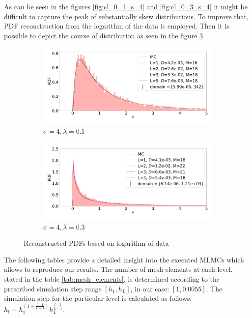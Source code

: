 \documentclass{article}
\begin{document}
As can be seen in the figures \ref{fig:cl_0_1_s_4} and \ref{fig:cl_0_3_s_4} it might be difficult to capture the peak of substantially skew distributions. To improve that, PDF reconstruction from the logarithm of the data is employed. Then it is possible to depict the course of distribution as seen in the figure \ref{fig:log_flow_distrs}.

\begin{figure}[!htp]
    \centering 
\begin{subfigure}{0.5\textwidth}
  \includegraphics[width=\linewidth]{porous_media_flow/MLMC/log/cl_0_1_s_4.pdf}
  \caption{$\sigma = 4, \lambda=0.1$}
  \label{fig:cl_0_1_s_4_log}
\end{subfigure}\hfil 
\begin{subfigure}{0.5\textwidth}
  \includegraphics[width=\linewidth]{porous_media_flow/MLMC/log/cl_0_3_s_4.pdf}
  \caption{$\sigma = 4, \lambda=0.3$}
  \label{fig:cl_0_3_s_4_log}
\end{subfigure}\hfil 
\caption{Reconstructed PDFs based on logarithm of data}
\label{fig:log_flow_distrs}
\end{figure}
\FloatBarrier


The following tables provide a detailed insight into the executed MLMCs which allows to reproduce our results. The number of mesh elements at each level, stated in the table \ref{tab:mesh_elements}, is determined according to the prescribed simulation step range $[h_1, h_L]$, in our case: $[1, 0.0055]$. The simulation step for the particular level is calculated as follows: $h_l = h_1^{(1 - \frac{l-1}{L-1})} h_L^{ \frac{l-1}{L-1}}$.
\end{document}
